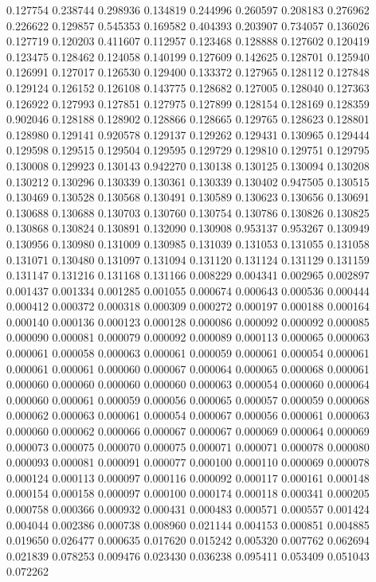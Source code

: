 0.127754
0.238744
0.298936
0.134819
0.244996
0.260597
0.208183
0.276962
0.226622
0.129857
0.545353
0.169582
0.404393
0.203907
0.734057
0.136026
0.127719
0.120203
0.411607
0.112957
0.123468
0.128888
0.127602
0.120419
0.123475
0.128462
0.124058
0.140199
0.127609
0.142625
0.128701
0.125940
0.126991
0.127017
0.126530
0.129400
0.133372
0.127965
0.128112
0.127848
0.129124
0.126152
0.126108
0.143775
0.128682
0.127005
0.128040
0.127363
0.126922
0.127993
0.127851
0.127975
0.127899
0.128154
0.128169
0.128359
0.902046
0.128188
0.128902
0.128866
0.128665
0.129765
0.128623
0.128801
0.128980
0.129141
0.920578
0.129137
0.129262
0.129431
0.130965
0.129444
0.129598
0.129515
0.129504
0.129595
0.129729
0.129810
0.129751
0.129795
0.130008
0.129923
0.130143
0.942270
0.130138
0.130125
0.130094
0.130208
0.130212
0.130296
0.130339
0.130361
0.130339
0.130402
0.947505
0.130515
0.130469
0.130528
0.130568
0.130491
0.130589
0.130623
0.130656
0.130691
0.130688
0.130688
0.130703
0.130760
0.130754
0.130786
0.130826
0.130825
0.130868
0.130824
0.130891
0.132090
0.130908
0.953137
0.953267
0.130949
0.130956
0.130980
0.131009
0.130985
0.131039
0.131053
0.131055
0.131058
0.131071
0.130480
0.131097
0.131094
0.131120
0.131124
0.131129
0.131159
0.131147
0.131216
0.131168
0.131166
0.008229
0.004341
0.002965
0.002897
0.001437
0.001334
0.001285
0.001055
0.000674
0.000643
0.000536
0.000444
0.000412
0.000372
0.000318
0.000309
0.000272
0.000197
0.000188
0.000164
0.000140
0.000136
0.000123
0.000128
0.000086
0.000092
0.000092
0.000085
0.000090
0.000081
0.000079
0.000092
0.000089
0.000113
0.000065
0.000063
0.000061
0.000058
0.000063
0.000061
0.000059
0.000061
0.000054
0.000061
0.000061
0.000061
0.000060
0.000067
0.000064
0.000065
0.000068
0.000061
0.000060
0.000060
0.000060
0.000060
0.000063
0.000054
0.000060
0.000064
0.000060
0.000061
0.000059
0.000056
0.000065
0.000057
0.000059
0.000068
0.000062
0.000063
0.000061
0.000054
0.000067
0.000056
0.000061
0.000063
0.000060
0.000062
0.000066
0.000067
0.000067
0.000069
0.000064
0.000069
0.000073
0.000075
0.000070
0.000075
0.000071
0.000071
0.000078
0.000080
0.000093
0.000081
0.000091
0.000077
0.000100
0.000110
0.000069
0.000078
0.000124
0.000113
0.000097
0.000116
0.000092
0.000117
0.000161
0.000148
0.000154
0.000158
0.000097
0.000100
0.000174
0.000118
0.000341
0.000205
0.000758
0.000366
0.000932
0.000431
0.000483
0.000571
0.000557
0.001424
0.004044
0.002386
0.000738
0.008960
0.021144
0.004153
0.000851
0.004885
0.019650
0.026477
0.000635
0.017620
0.015242
0.005320
0.007762
0.062694
0.021839
0.078253
0.009476
0.023430
0.036238
0.095411
0.053409
0.051043
0.072262

